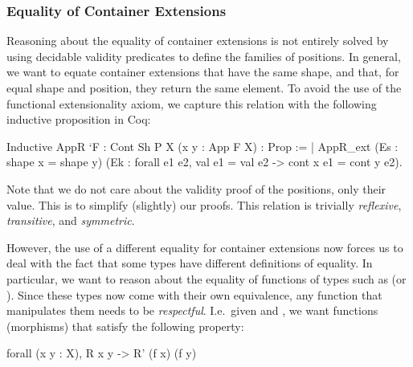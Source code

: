 \documentclass[ a4paper, UKenglish, cleveref, autoref, thm-restate]{lipics-v2021}
\begin{document}
\subsubsection{Equality of Container Extensions}
Reasoning about the equality of container extensions is not entirely solved by
using decidable validity predicates to define the families of positions. In
general, we want to equate container extensions that have the same shape, and
that, for equal shape and position, they return the same element. To avoid the
use of the functional extensionality axiom, we capture this relation with the
following inductive proposition in Coq:
\begin{coqcode}
Inductive AppR `{F : Cont Sh P} {X} (x y : App F X) : Prop :=
| AppR_ext (Es : shape x = shape y)
           (Ek : forall e1 e2, val e1 = val e2 -> cont x e1 = cont y e2).
\end{coqcode}
Note that  we do not care about the validity proof of the positions, only their
value. This is to simplify (slightly) our proofs. This relation is
trivially \emph{reflexive}, \emph{transitive}, and \emph{symmetric}.

However, the use of a different equality for container extensions now forces us
to deal with the fact that some types have different definitions of equality.
In particular, we want to reason about the equality of functions of types such
as  (or ). Since 
these types now come with their own equivalence, any function that manipulates
them needs to be \emph{respectful}. I.e.\ given 
 and ,
we want functions (morphisms) that satisfy the following property:
\begin{coqcode}
forall (x y : X), R x y -> R' (f x) (f y)
\end{coqcode}
\end{document}
